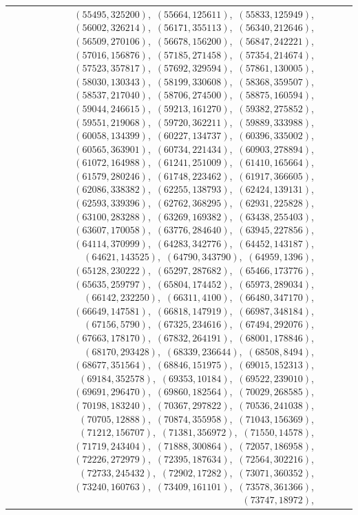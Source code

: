 \documentclass[11pt]{article}
\begin{document}
\begin{longtable}{@{}rrl>{\raggedright\arraybackslash}p{}@{}}
$(55495,325200)$,\allowbreak\ $(55664,125611)$,\allowbreak\ $(55833,125949)$,\allowbreak\ $(56002,326214)$,\allowbreak\ $(56171,355113)$,\allowbreak\ $(56340,212646)$,\allowbreak\ $(56509,270106)$,\allowbreak\ $(56678,156200)$,\allowbreak\ $(56847,242221)$,\allowbreak\ $(57016,156876)$,\allowbreak\ $(57185,271458)$,\allowbreak\ $(57354,214674)$,\allowbreak\ $(57523,357817)$,\allowbreak\ $(57692,329594)$,\allowbreak\ $(57861,130005)$,\allowbreak\ $(58030,130343)$,\allowbreak\ $(58199,330608)$,\allowbreak\ $(58368,359507)$,\allowbreak\ $(58537,217040)$,\allowbreak\ $(58706,274500)$,\allowbreak\ $(58875,160594)$,\allowbreak\ $(59044,246615)$,\allowbreak\ $(59213,161270)$,\allowbreak\ $(59382,275852)$,\allowbreak\ $(59551,219068)$,\allowbreak\ $(59720,362211)$,\allowbreak\ $(59889,333988)$,\allowbreak\ $(60058,134399)$,\allowbreak\ $(60227,134737)$,\allowbreak\ $(60396,335002)$,\allowbreak\ $(60565,363901)$,\allowbreak\ $(60734,221434)$,\allowbreak\ $(60903,278894)$,\allowbreak\ $(61072,164988)$,\allowbreak\ $(61241,251009)$,\allowbreak\ $(61410,165664)$,\allowbreak\ $(61579,280246)$,\allowbreak\ $(61748,223462)$,\allowbreak\ $(61917,366605)$,\allowbreak\ $(62086,338382)$,\allowbreak\ $(62255,138793)$,\allowbreak\ $(62424,139131)$,\allowbreak\ $(62593,339396)$,\allowbreak\ $(62762,368295)$,\allowbreak\ $(62931,225828)$,\allowbreak\ $(63100,283288)$,\allowbreak\ $(63269,169382)$,\allowbreak\ $(63438,255403)$,\allowbreak\ $(63607,170058)$,\allowbreak\ $(63776,284640)$,\allowbreak\ $(63945,227856)$,\allowbreak\ $(64114,370999)$,\allowbreak\ $(64283,342776)$,\allowbreak\ $(64452,143187)$,\allowbreak\ $(64621,143525)$,\allowbreak\ $(64790,343790)$,\allowbreak\ $(64959,1396)$,\allowbreak\ $(65128,230222)$,\allowbreak\ $(65297,287682)$,\allowbreak\ $(65466,173776)$,\allowbreak\ $(65635,259797)$,\allowbreak\ $(65804,174452)$,\allowbreak\ $(65973,289034)$,\allowbreak\ $(66142,232250)$,\allowbreak\ $(66311,4100)$,\allowbreak\ $(66480,347170)$,\allowbreak\ $(66649,147581)$,\allowbreak\ $(66818,147919)$,\allowbreak\ $(66987,348184)$,\allowbreak\ $(67156,5790)$,\allowbreak\ $(67325,234616)$,\allowbreak\ $(67494,292076)$,\allowbreak\ $(67663,178170)$,\allowbreak\ $(67832,264191)$,\allowbreak\ $(68001,178846)$,\allowbreak\ $(68170,293428)$,\allowbreak\ $(68339,236644)$,\allowbreak\ $(68508,8494)$,\allowbreak\ $(68677,351564)$,\allowbreak\ $(68846,151975)$,\allowbreak\ $(69015,152313)$,\allowbreak\ $(69184,352578)$,\allowbreak\ $(69353,10184)$,\allowbreak\ $(69522,239010)$,\allowbreak\ $(69691,296470)$,\allowbreak\ $(69860,182564)$,\allowbreak\ $(70029,268585)$,\allowbreak\ $(70198,183240)$,\allowbreak\ $(70367,297822)$,\allowbreak\ $(70536,241038)$,\allowbreak\ $(70705,12888)$,\allowbreak\ $(70874,355958)$,\allowbreak\ $(71043,156369)$,\allowbreak\ $(71212,156707)$,\allowbreak\ $(71381,356972)$,\allowbreak\ $(71550,14578)$,\allowbreak\ $(71719,243404)$,\allowbreak\ $(71888,300864)$,\allowbreak\ $(72057,186958)$,\allowbreak\ $(72226,272979)$,\allowbreak\ $(72395,187634)$,\allowbreak\ $(72564,302216)$,\allowbreak\ $(72733,245432)$,\allowbreak\ $(72902,17282)$,\allowbreak\ $(73071,360352)$,\allowbreak\ $(73240,160763)$,\allowbreak\ $(73409,161101)$,\allowbreak\ $(73578,361366)$,\allowbreak\ $(73747,18972)$,\allowbreak\ 
\end{longtable}
\end{document}
